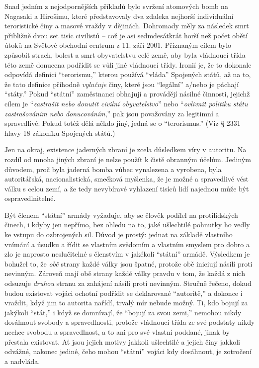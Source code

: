 \documentclass{book}
\begin{document}
Snad jedním z nejodpornějších příkladů bylo svržení atomových bomb na Nagasaki a Hirošimu, které představovaly dva zdaleka nejhorší individuální teroristické činy a masové vraždy v dějinách. Dohromady měly za následek smrt přibližně dvou set tisíc civilistů -- což je asi sedmdesátkrát horší než počet obětí útoků na Světové obchodní centrum z 11. září 2001. Přiznaným cílem bylo způsobit strach, bolest a smrt obyvatelstvu celé země, aby byla vládnoucí třída této země donucena podřídit se vůli jiné vládnoucí třídy. Ironií je, že to dokonale odpovídá definici \enquote{terorismu,} kterou používá \enquote{vláda} Spojených států, až na to, že tato definice příhodně \emph{vylučuje} činy, které jsou \enquote{legální} a/nebo je páchají \enquote{státy.} Pokud \enquote{státní} zaměstnanci obhajují a provádějí násilné činnosti, jejichž cílem je \enquote{\emph{zastrašit nebo donutit civilní obyvatelstvo}} nebo \enquote{\emph{ovlivnit politiku státu zastrašováním nebo donucováním},} pak jsou považovány za legitimní a spravedlivé. Pokud totéž dělá někdo jiný, jedná se o \enquote{terorismus.} (Viz § 2331 hlavy 18 zákoníku Spojených států.)

Jen na okraj, existence jaderných zbraní je zcela důsledkem víry v autoritu. Na rozdíl od mnoha jiných zbraní je nelze použít k čistě obranným účelům. Jediným důvodem, proč byla jaderná bomba vůbec vynalezena a vyrobena, byla autoritářská, nacionalistická, smečková myšlenka, že je možné a spravedlivé vést válku s celou zemí, a že tedy nevybíravé vyhlazení tisíců lidí najednou může být ospravedlnitelné.

Být členem \enquote{státní} armády vyžaduje, aby se člověk podílel na protilidských činech, i kdyby jen nepřímo, bez ohledu na to, jaké ušlechtilé pohnutky ho vedly ke vstupu do ozbrojených sil. Důvod je prostý: jednat na základě vlastního vnímání a úsudku a řídit se vlastním svědomím a vlastním smyslem pro dobro a zlo je naprosto neslučitelné s členstvím v jakékoli \enquote{státní} armádě. Výsledkem je bohužel to, že \emph{obě} strany každé války jsou špatné, protože obě iniciují násilí proti nevinným. Zároveň mají obě strany každé války pravdu v tom, že každá z nich odsuzuje \emph{druhou} stranu za zahájení násilí proti nevinným. Stručně řečeno, dokud budou existovat vojáci ochotní podřídit se deklarované \enquote{autoritě,} a dokonce i vraždit, když jim to autorita nařídí, trvalý mír nebude možný. Ti, kdo bojují za jakýkoli \enquote{stát,} i když se domnívají, že \enquote{bojují za svou zemi,} nemohou nikdy dosáhnout svobody a spravedlnosti, protože vládnoucí třída ze své podstaty nikdy nechce svobodu a spravedlnost, a to ani pro své vlastní poddané, jinak by přestala existovat. Ať jsou jejich motivy jakkoli ušlechtilé a jejich činy jakkoli odvážné, nakonec jediné, čeho mohou \enquote{státní} vojáci kdy dosáhnout, je zotročení a nadvláda.
\end{document}
